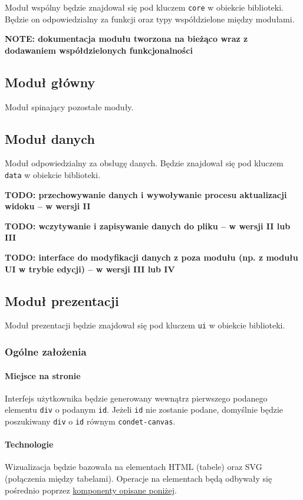 \documentclass{article}
\def\code#1{\texttt{#1}}
\begin{document}
Moduł wspólny będzie znajdował się pod kluczem \code{core} w obiekcie biblioteki. Będzie on odpowiedzialny za funkcji oraz typy współdzielone między modułami.

\textbf{NOTE: dokumentacja modułu tworzona na bieżąco wraz z dodawaniem współdzielonych funkcjonalności}

\subsection{Moduł główny}

Moduł spinający pozostałe moduły.

\subsection{Moduł danych}

Moduł odpowiedzialny za obsługę danych. Będzie znajdował się pod kluczem \code{data} w obiekcie biblioteki.

\textbf{TODO: przechowywanie danych i wywoływanie procesu aktualizacji widoku -- w wersji II}

\textbf{TODO: wczytywanie i zapisywanie danych do pliku -- w wersji II lub III}

\textbf{TODO: interface do modyfikacji danych z poza modułu (np. z modułu UI w trybie edycji) -- w wersji III lub IV}

\subsection{Moduł prezentacji}

Moduł prezentacji będzie znajdował się pod kluczem \code{ui} w obiekcie biblioteki.

\subsubsection{Ogólne założenia}
\paragraph{Miejsce na stronie}
Interfejs użytkownika będzie generowany wewnątrz pierwszego podanego elementu \code{div} o podanym \code{id}. Jeżeli \code{id} nie zostanie podane, domyślnie będzie poszukiwany \code{div} o \code{id} równym \code{condet-canvas}.

\paragraph{Technologie}
Wizualizacja będzie bazowała na elementach HTML (tabele) oraz SVG (połączenia między tabelami). Operacje na elementach będą odbywały się pośrednio poprzez \hyperref[sssec:components]{komponenty opisane poniżej}.
\end{document}

